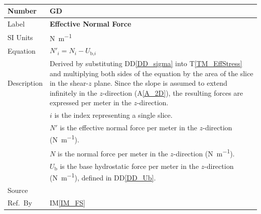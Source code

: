 \documentclass[12pt]{article}
\newcommand{\colAwidth}{0.13\textwidth}
\newcommand{\colBwidth}{0.82\textwidth}
\newcommand{\aref}[1]{A\ref{#1}}
\newcommand{\tref}[1]{T\ref{#1}}
\renewcommand{\arraystretch}{1}
\newcommand{\iref}[1]{IM\ref{#1}}
\newcommand{\ddref}[1]{DD\ref{#1}}
\newcounter{defnum} %
\begin{document}
~\newline

\noindent
\begin{minipage}{\textwidth}
	\renewcommand*{\arraystretch}{1.5}
	\begin{tabular}{| p{\colAwidth} | p{\colBwidth}|}
		
		\hline \rowcolor[gray]{0.9} Number&
		GD{defnum}\thedefnum \label{GD_EffNormal}\\
		
		\hline Label&\bf Effective Normal Force\\
		\hline SI Units & \si{\newton\per\meter}\\
		
		\hline Equation & \( N'_{i} = N_{i} - U_{\text{b,}i} \) \\
	
	\hline Description & Derived by substituting \ddref{DD_sigma} into 
	\tref{TM_EffStress} and multiplying both sides of the equation by the area 
	of the slice in the shear-$z$ plane. Since the slope is assumed to extend 
	infinitely in the $z$-direction (\aref{A_2D}), the resulting forces are 
	expressed per meter in the $z$-direction. 
	\\
	&$i$ is the index representing a single slice.\\
	&$N'$ is the effective normal force per meter in the $z$-direction 
	(\si{\newton\per\meter}).\\
	&$N$ is the normal force per meter in the $z$-direction 
	(\si{\newton\per\meter}).\\
	&$U_\text{b}$ is the base hydrostatic force per meter in the $z$-direction 
	(\si{\newton\per\meter}), 
	defined in \ddref{DD_Ub}.\\
	
	\hline Source & \cite{ZhuEtAl2005}\\
	
	\hline Ref.\ By & \iref{IM_FS} \\
	
	\hline
\end{tabular}
\end{minipage}\\

~\newline

\end{document}

